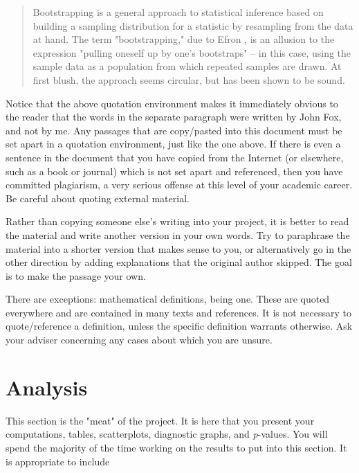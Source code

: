\documentclass[11pt]{article}
\begin{document}
\begin{quote}
Bootstrapping is a general approach to statistical inference based on
building a sampling distribution for a statistic by resampling from
the data at hand. The term "bootstrapping," due to Efron
\cite{Efron1972}, is an allusion to the expression "pulling oneself up
by one’s bootstraps" -- in this case, using the sample data as a
population from which repeated samples are drawn. At first blush, the
approach seems circular, but has been shown to be sound.
\end{quote}

Notice that the above quotation environment makes it immediately
obvious to the reader that the words in the separate paragraph were
written by John Fox, and not by me. Any passages that are copy/pasted
into this document must be set apart in a quotation environment, just
like the one above. If there is even a sentence in the document that
you have copied from the Internet (or elsewhere, such as a book or
journal) which is not set apart and referenced, then you have
committed plagiarism, a very serious offense at this level of your
academic career. Be careful about quoting external material.

Rather than copying someone else's writing into your project, it is
better to read the material and write another version in your own
words. Try to paraphrase the material into a shorter version that
makes sense to you, or alternatively go in the other direction by
adding explanations that the original author skipped. The goal is to
make the passage your own.

There are exceptions: mathematical definitions, being one. These are
quoted everywhere and are contained in many texts and references. It
is not necessary to quote/reference a definition, unless the specific
definition warrants otherwise. Ask your adviser concerning any cases
about which you are unsure.

\newpage

\section[Analysis]{Analysis}
\label{sec-4}

This section is the "meat" of the project. It is here that you present
your computations, tables, scatterplots, diagnostic graphs, and
\emph{p}-values. You will spend the majority of the time working on the
results to put into this section. It is appropriate to include
\end{document}
